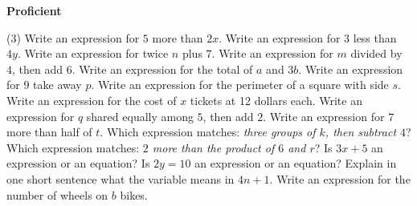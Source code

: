 \documentclass[17pt,a4paper,landscape]{extarticle}
\begin{document}
\sffamily
\boldmath

\boldmath

{\LARGE \textbf{Proficient}}
\begin{tasks}(3)
\task Write an expression for \mbox{$5$} more than \mbox{$2x$}.
\task Write an expression for \mbox{$3$} less than \mbox{$4y$}.
\task Write an expression for twice \mbox{$n$} plus \mbox{$7$}.
\task Write an expression for \mbox{$m$} divided by \mbox{$4$}, then add \mbox{$6$}.
\task Write an expression for the total of \mbox{$a$} and \mbox{$3b$}.
\task Write an expression for \mbox{$9$} take away \mbox{$p$}.
\task Write an expression for the perimeter of a square with side \mbox{$s$}.
\task Write an expression for the cost of \mbox{$x$} tickets at 12 dollars each.
\task Write an expression for \mbox{$q$} shared equally among \mbox{$5$}, then add \mbox{$2$}.
\task Write an expression for \mbox{$7$} more than half of \mbox{$t$}.
\task Which expression matches: \textit{three groups of \mbox{$k$}, then subtract \mbox{$4$}}?
\task Which expression matches: \textit{\mbox{$2$} more than the product of \mbox{$6$} and \mbox{$r$}}?
\task Is \mbox{$3x+5$} an expression or an equation?
\task Is \mbox{$2y=10$} an expression or an equation?
\task Explain in one short sentence what the variable means in \mbox{$4n+1$}.
\task Write an expression for the number of wheels on \mbox{$b$} bikes.
\end{tasks}
\end{document}
